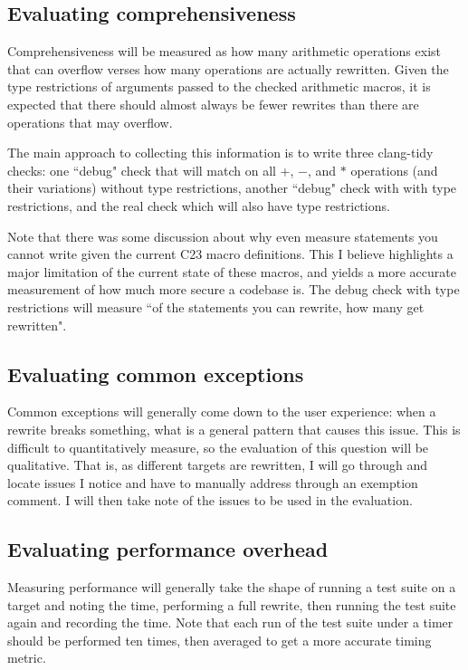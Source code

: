 \subsection{Evaluating comprehensiveness}

Comprehensiveness will be measured as how many arithmetic operations exist that can overflow verses how many operations are actually rewritten. Given the type restrictions of arguments passed to the checked arithmetic macros, it is expected that there should almost always be fewer rewrites than there are operations that may overflow.

The main approach to collecting this information is to write three clang-tidy checks: one ``debug" check that will match on all $+$, $-$, and $*$ operations (and their variations) without type restrictions, another ``debug" check with with type restrictions, and the real check which will also have type restrictions.

Note that there was some discussion about why even measure statements you cannot write given the current C23 macro definitions. This I believe highlights a major limitation of the current state of these macros, and yields a more accurate measurement of how much more secure a codebase is. The debug check with type restrictions will measure ``of the statements you can rewrite, how many get rewritten".

\subsection{Evaluating common exceptions}

Common exceptions will generally come down to the user experience: when a rewrite breaks something, what is a general pattern that causes this issue. This is difficult to quantitatively measure, so the evaluation of this question will be qualitative. That is, as different targets are rewritten, I will go through and locate issues I notice and have to manually address through an exemption comment. I will then take note of the issues to be used in the evaluation.

\subsection{Evaluating performance overhead}

Measuring performance will generally take the shape of running a test suite on a target and noting the time, performing a full rewrite, then running the test suite again and recording the time. Note that each run of the test suite under a timer should be performed ten times, then averaged to get a more accurate timing metric.

